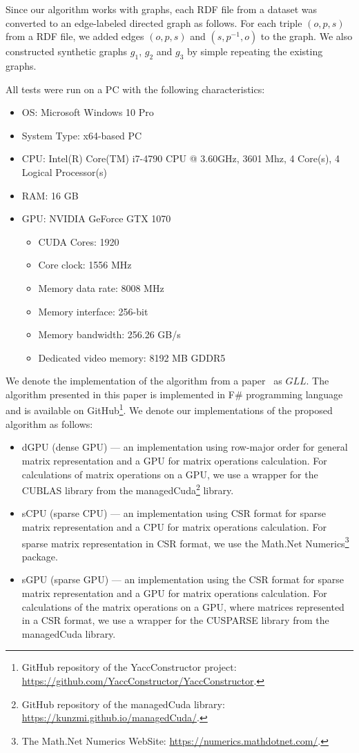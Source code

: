 \documentclass[runningheads,a4paper]{llncs}
\begin{document}
Since our algorithm works with graphs, each RDF file from a dataset was converted to an edge-labeled directed graph as follows. For each triple $(o,p,s)$ from a RDF file, we added edges $(o,p,s)$ and $(s,p^{-1},o)$ to the graph. We also constructed synthetic graphs $g_1$, $g_2$ and $g_3$ by simple repeating the existing graphs.

All tests were run on a PC with the following characteristics:
\begin{itemize}
	\item OS: Microsoft Windows 10 Pro
	\item System Type: x64-based PC
	\item CPU: Intel(R) Core(TM) i7-4790 CPU @ 3.60GHz, 3601 Mhz, 4 Core(s), 4 Logical Processor(s)
	\item RAM: 16 GB
	\item GPU: NVIDIA GeForce GTX 1070
	\begin{itemize}
		\item CUDA Cores:		1920 
		\item Core clock:		1556 MHz 
		\item Memory data rate:	8008 MHz
		\item Memory interface:	256-bit 
		\item Memory bandwidth:	256.26 GB/s
		\item Dedicated video memory:	8192 MB GDDR5
	\end{itemize}
\end{itemize}

We denote the implementation of the algorithm from a paper~\cite{GLL} as $GLL$. The algorithm presented in this paper is implemented in F\# programming language~\cite{fsharp} and is available on GitHub\footnote{GitHub repository of the YaccConstructor project: \url{https://github.com/YaccConstructor/YaccConstructor}.}. We denote our implementations of the proposed algorithm as follows:
\begin{itemize}
	\item dGPU (dense GPU) --- an implementation using row-major order for general matrix representation and a GPU for matrix operations calculation. For calculations of matrix operations on a GPU, we use a wrapper for the CUBLAS library from the managedCuda\footnote{GitHub repository of the managedCuda library: \url{https://kunzmi.github.io/managedCuda/}.} library.
	\item sCPU (sparse CPU) --- an implementation using CSR format for sparse matrix representation and a CPU for matrix operations calculation. For sparse matrix representation in CSR format, we use the Math.Net Numerics\footnote{The Math.Net Numerics WebSite: \url{https://numerics.mathdotnet.com/}.} package.
	\item sGPU (sparse GPU) --- an implementation using the CSR format for sparse matrix representation and a GPU for matrix operations calculation. For calculations of the matrix operations on a GPU, where matrices represented in a CSR format, we use a wrapper for the CUSPARSE library from the managedCuda library.
\end{itemize}
\end{document}
